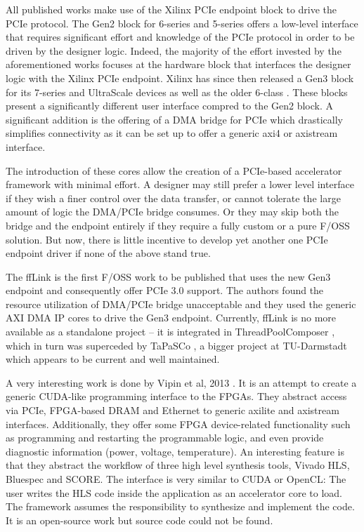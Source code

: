 All published works make use of the Xilinx PCIe endpoint block to drive the PCIe protocol. 
The Gen2 block for 6-series \cite{ug571} and 5-series \cite{ug197} offers a low-level interface that requires significant effort 
and knowledge of the PCIe protocol in order to be driven by the designer logic.
Indeed, the majority of the effort invested by the aforementioned works focuses 
at the hardware block that interfaces the designer logic with the Xilinx PCIe endpoint.
Xilinx has since then released a Gen3 block for its 7-series \cite{pg054} 
and UltraScale devices \cite{pg156} as well as the older 6-class \cite{ug671}.
These blocks present a significantly different user interface compred to the Gen2 block.
A significant addition is the offering of a DMA bridge for PCIe \cite{pg195} which drastically simplifies connectivity as it can be set up to offer
a generic \gls{axi}4 or \gls{axistream} interface.

The introduction of these cores allow the creation of a PCIe-based accelerator framework with minimal effort.
A designer may still prefer a lower level interface if they wish a finer control over the data transfer,
or cannot tolerate the large amount of logic \cite{dmapcie} the DMA/PCIe bridge consumes. 
Or they may skip both the bridge and the endpoint entirely if they require a fully custom or a pure F/OSS solution.
But now, there is little incentive to develop yet another one PCIe endpoint driver if none of the above stand true.

The ffLink \cite{fflink} is the first F/OSS work to be published that uses the new Gen3 endpoint and consequently offer PCIe 3.0 support.
The authors found the resource utilization of DMA/PCIe bridge unacceptable and they used the generic AXI DMA IP cores to drive the Gen3 endpoint.
Currently, ffLink is no more available as a standalone project -- it is integrated in ThreadPoolComposer \cite{tpc}, which in turn was
superceded by TaPaSCo \cite{tapasco}, a bigger project at TU-Darmstadt which appears to be current and well maintained.

A very interesting work is done by Vipin et al, 2013 \cite{vipin}. 
It is an attempt to create a generic CUDA-like programming interface to the FPGAs. 
They abstract access via PCIe, FPGA-based DRAM and Ethernet to generic \gls{axilite} and \gls{axistream} interfaces.
Additionally, they offer some FPGA device-related functionality such as programming and restarting the programmable logic,
and even provide diagnostic information (power, voltage, temperature).
An interesting feature is that they abstract the workflow of three high level synthesis tools, Vivado HLS, Bluespec and SCORE.
The interface is very similar to CUDA or OpenCL: The user writes the HLS code inside the application as an accelerator core to load.
The framework assumes the responsibility to synthesize and implement the code. 
It is an open-source work but source code could not be found.

